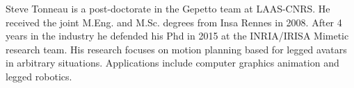 \documentclass[journal]{IEEEtran}
\begin{document}


%



% 


\begin{IEEEbiography}{Steve Tonneau} is a post-doctorate in the Gepetto team at LAAS-CNRS. He received the joint M.Eng. and M.Sc. degrees from Insa Rennes in 2008. After 4 years in the industry he defended his Phd in 2015 at the INRIA/IRISA Mimetic research team. His research focuses on motion planning based for legged avatars in arbitrary situations. Applications include computer graphics animation and legged robotics.
\end{IEEEbiography}
\end{document}
